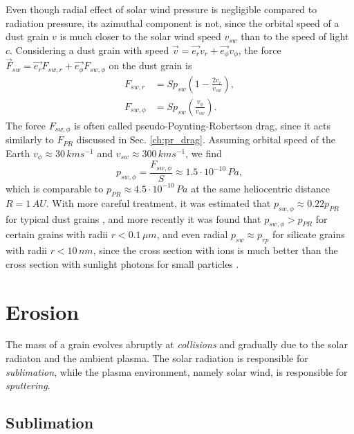 Even though radial effect of solar wind pressure is negligible compared to radiation pressure, its azimuthal component is not, since the orbital speed of a dust grain $v$ is much closer to the solar wind speed $v_{sw}$ than to the speed of light $c$. Considering a dust grain with speed $\vec{v} = \vec{e_r}v_r + \vec{e_\phi}v_\phi$, the force $\vec{F}_{sw} = \vec{e_r}F_{sw,r} + \vec{e_\phi}F_{sw,\phi}$ on the dust grain is \citep{burns1979radiation}
\begin{equation}\begin{split}
    F_{sw,r} &= S p_{sw} \left( 1-\frac{2v_r}{v_{sw}} \right), \\
    F_{sw,\phi} &= S p_{sw} \left( \frac{v_\phi}{v_{sw}} \right).
\end{split}\end{equation}
The force $F_{sw,\phi}$ is often called pseudo-Poynting-Robertson drag, since it acts similarly to $F_{PR}$ discussed in Sec. \ref{ch:pr_drag}. Assuming orbital speed of the Earth $v_\phi \approx 30 \, \si{km s^{-1}}$ and $v_{sw} \approx 300 \, \si{km s^{-1}}$, we find 
\begin{equation}
    p_{sw,\phi} = \frac{F_{sw,\phi}}{S} \approx 1.5 \cdot 10^{-10} \, \si{Pa},
\end{equation}
which is comparable to $p_{PR} \approx 4.5 \cdot 10^{-10} \, \si{Pa}$ at the same heliocentric distance $R = 1 \, \si{AU}$. With more careful treatment, it was estimated that $p_{sw,\phi} \approx 0.22 p_{PR}$ for typical dust grains \citep{whipple1967maintaining}, and more recently it was found that $p_{sw,\phi} > p_{PR}$ for certain grains with radii $r<0.1 \, \si{\mu m}$, and even radial $p_{sw} \approx p_{rp}$ for silicate grains with radii $r<10 \, \si{nm}$, since the cross section with ions is much better than the cross section with sunlight photons for small particles \citep{mukai1982solar}. 

\section{Erosion} \label{ch:erosion}

The mass of a grain evolves abruptly at \textit{collisions} and gradually due to the solar radiaton and the ambient plasma. The solar radiation is responsible for \textit{sublimation}, while the plasma environment, namely solar wind, is responsible for \textit{sputtering}. 

\subsection{Sublimation}

